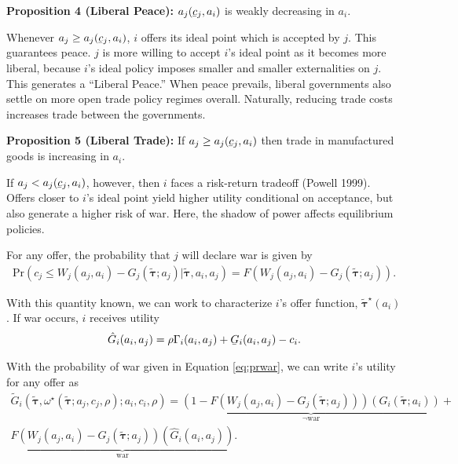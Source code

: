 \documentclass{puthesis}
\DeclareRobustCommand{\ubar}[1]{\underaccent{\bar}{#1}}
\begin{document}
\textbf{Proposition 4 (Liberal Peace):} \(a_j(\ubar{c}_j, a_i)\) is
weakly decreasing in \(a_i\).

Whenever \(a_j \geq a_j(\ubar{c}_j, a_i)\), \(i\) offers its ideal point
which is accepted by \(j\). This guarantees peace. \(j\) is more willing
to accept \(i\)'s ideal point as it becomes more liberal, because
\(i\)'s ideal policy imposes smaller and smaller externalities on \(j\).
This generates a ``Liberal Peace.'' When peace prevails, liberal
governments also settle on more open trade policy regimes overall.
Naturally, reducing trade costs increases trade between the governments.

\textbf{Proposition 5 (Liberal Trade):} If
\(a_j \geq a_j(\ubar{c}_j, a_i)\) then trade in manufactured goods is
increasing in \(a_i\).

If \(a_j < a_j(\ubar{c}_j, a_i)\), however, then \(i\) faces a
risk-return tradeoff (Powell 1999). Offers closer to \(i\)'s ideal point
yield higher utility conditional on acceptance, but also generate a
higher risk of war. Here, the shadow of power affects equilibrium
policies.

For any offer, the probability that \(j\) will declare war is given by
\begin{equation} \label{eq:prwar}
\begin{split}
\text{Pr} \left( c_j \leq W_j(a_j, a_i) - G_j(\tilde{\bm{\tau}}; a_j) | \tilde{\bm{\tau}}, a_i, a_j \right) = F \left( W_j(a_j, a_i) - G_j(\tilde{\bm{\tau}}; a_j)  \right) .
\end{split}
\end{equation}

With this quantity known, we can work to characterize \(i\)'s offer
function, \(\tilde{\bm{\tau}}^\star(a_i)\). If war occurs, \(i\)
receives utility \begin{equation*} \label{eq:Ghati}
\hat{G}_i(a_i, a_j) = \rho \Gamma_i(a_i, a_j) + \ubar{G}_i(a_i, a_j) - c_i .
\end{equation*}

With the probability of war given in Equation \ref{eq:prwar}, we can
write \(i\)'s utility for any offer as
\begin{equation} \label{eq:Gtildei}
\begin{split}
\tilde{G}_i \left( \tilde{\bm{\tau}}, \omega^\star(\tilde{\bm{\tau}}; a_j, c_j, \rho); a_i, c_i, \rho \right) = \underbrace{\left( 1 - F \left( W_j(a_j, a_i) - G_j( \tilde{\bm{\tau}}; a_j ) \right) \right) \left( G_i( \tilde{\bm{\tau}}; a_i ) \right)}_{\neg \text{war}} + \\
\underbrace{F \left( W_j(a_j, a_i) - G_j(\tilde{\bm{\tau}}; a_j) \right) \left( \hat{G}_i(a_i, a_j) \right)}_{\text{war}} .
\end{split}
\end{equation}
\end{document}
